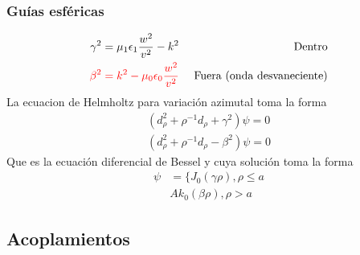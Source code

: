 \subsubsection{Guías esféricas}
\begin{subequations}
	\begin{align}
	\gamma^2 =  \mu_{1} \epsilon_{1} \frac{w^2}{v^2} - k^2   && \text{  Dentro}\\
	\textcolor{red}{\beta^2 = k^2 - \mu_{0} \epsilon_{0} \frac{w^2}{v^2}}   && \text{ Fuera (onda desvaneciente)}
	\end{align}
\end{subequations}
La ecuacion de Helmholtz para variación azimutal toma la forma
\begin{subequations}
	\begin{align}
	(d_{\rho}^2+\rho^{-1} d_{\rho}+\gamma^2) \psi = 0\\
	(d_{\rho}^2+\rho^{-1} d_{\rho}-\beta^2) \psi = 0
	\end{align}
\end{subequations}
Que es la ecuación diferencial de Bessel y cuya solución toma la forma
\begin{equation} \label{Soluciones metalico bessel}
\begin{split}
\psi  & = \bigg \{ J_{0} (\gamma \rho), \rho \leq a\\
&   A k_{0} (\beta \rho), \rho > a
\end{split}
\end{equation}
\subsection{Acoplamientos}